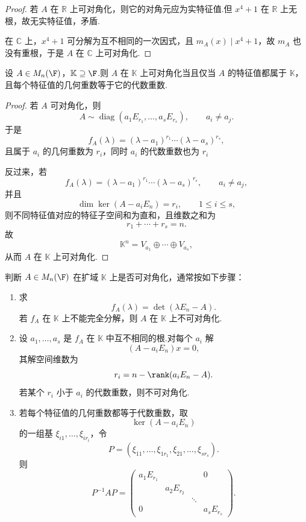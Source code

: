 \begin{proof}
	若 $A$ 在 $\mathbb R$ 上可对角化，则它的对角元应为实特征值.但 $x^4+1$ 在 $\mathbb R$ 上无根，故无实特征值，矛盾.
	
	在 $\mathbb C$ 上，$x^4+1$ 可分解为互不相同的一次因式，且 $m_A(x)\mid x^4+1$，故 $m_A$ 也没有重根，于是 $A$ 在 $\mathbb C$ 上可对角化.
\end{proof}

\begin{lemma}
	设 $A\in M_n(\F)$，$\mathbb K\supseteq\F$.则 $A$ 在 $\mathbb K$ 上可对角化当且仅当 $A$ 的特征值都属于 $\mathbb K$，且每个特征值的几何重数等于它的代数重数.
\end{lemma}

\begin{proof}
	若 $A$ 可对角化，则
	\[
	A\sim \operatorname{diag}(a_1E_{r_1},\ldots,a_sE_{r_s}),
	\qquad a_i\neq a_j.
	\]
	于是
	\[
	f_A(\lambda)=(\lambda-a_1)^{r_1}\cdots(\lambda-a_s)^{r_s},
	\]
	且属于 $a_i$ 的几何重数为 $r_i$，同时 $a_i$ 的代数重数也为 $r_i$
	
	反过来，若
	\[
	f_A(\lambda)=(\lambda-a_1)^{r_1}\cdots(\lambda-a_s)^{r_s},
	\qquad a_i\neq a_j,
	\]
	并且
	\[
	\dim\ker(A-a_iE_n)=r_i,
	\qquad 1\leq i\leq s,
	\]
	则不同特征值对应的特征子空间和为直和，且维数之和为
	\[
	r_1+\cdots+r_s=n.
	\]
	故
	\[
	\mathbb K^n=V_{a_1}\oplus\cdots\oplus V_{a_s},
	\]
	从而 $A$ 在 $\mathbb K$ 上可对角化.
\end{proof}

\begin{algo}
	判断 $A\in M_n(\F)$ 在扩域 $\mathbb K$ 上是否可对角化，通常按如下步骤：
	\begin{enumerate}
		\item 求
		\[
		f_A(\lambda)=\det(\lambda E_n-A).
		\]
		若 $f_A$ 在 $\mathbb K$ 上不能完全分解，则 $A$ 在 $\mathbb K$ 上不可对角化.
		\item 设 $a_1,
		\ldots,a_s$ 是 $f_A$ 在 $\mathbb K$ 中互不相同的根.对每个 $a_i$ 解
		\[
		(A-a_iE_n)x=0,
		\]
		其解空间维数为
		\[
		r_i=n-\rank(a_iE_n-A).
		\]
		若某个 $r_i$ 小于 $a_i$ 的代数重数，则不可对角化.
		\item 若每个特征值的几何重数都等于代数重数，取
		\[
		\ker(A-a_iE_n)
		\]
		的一组基 $\xi_{i1},\ldots,\xi_{ir_i}$，令
		\[
		P=(\xi_{11},\ldots,\xi_{1r_1},\xi_{21},\ldots,\xi_{sr_s}).
		\]
		则
		\[
		P^{-1}AP=
		\begin{pmatrix}
			a_1E_{r_1}&&&0\\
			&a_2E_{r_2}&&\\
			&&\ddots&\\
			0&&&a_sE_{r_s}
		\end{pmatrix}.
		\]
	\end{enumerate}
\end{algo}


